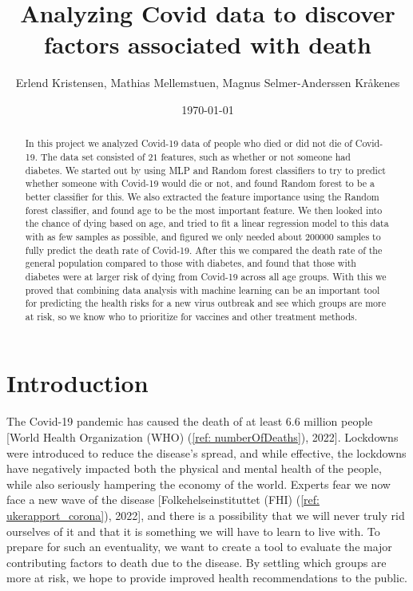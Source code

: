 \documentclass[english,notitlepage,reprint,nofootinbib]{revtex4-1}  %
\begin{document}
\title{Analyzing Covid data to discover factors associated with death}  %
\author{Erlend Kristensen, Mathias Mellemstuen, Magnus Selmer-Anderssen Kråkenes} %
\date{\today}      


\noaffiliation                            %

\begin{abstract}
    In this project we analyzed Covid-19 data of people who died or did not die of Covid-19. The data set consisted of $21$ features, such as whether or not someone had diabetes. We started out by using MLP and Random forest classifiers to try to predict whether someone with Covid-19 would die or not, and found Random forest to be a better classifier for this. We also extracted the feature importance using the Random forest classifier, and found age to be the most important feature. We then looked into the chance of dying based on age, and tried to fit a linear regression model to this data with as few samples as possible, and figured we only needed about $200 000$ samples to fully predict the death rate of Covid-19. After this we compared the death rate of the general population compared to those with diabetes, and found that those with diabetes were at larger risk of dying from Covid-19 across all age groups. With this we proved that combining data analysis with machine learning can be an important tool for predicting the health risks for a new virus outbreak and see which groups are more at risk, so we know who to prioritize for vaccines and other treatment methods.
\end{abstract}
\maketitle



\section{Introduction}
\label{sec:INTRODUCTION}
The Covid-19 pandemic has caused the death of at least 6.6 million people [World Health Organization (WHO) (\ref{ref: numberOfDeaths}), 2022]. Lockdowns were introduced to reduce the disease's spread, and while effective, the lockdowns have negatively impacted both the physical and mental health of the people, while also seriously hampering the economy of the world. Experts fear we now face a new wave of the disease [Folkehelseinstituttet (FHI) (\ref{ref: ukerapport_corona}), 2022], and there is a possibility that we will never truly rid ourselves of it and that it is something we will have to learn to live with. 
To prepare for such an eventuality, we want to create a tool to evaluate the major contributing factors to death due to the disease. By settling which groups are more at risk, we hope to provide improved health recommendations to the public. 
\end{document}
